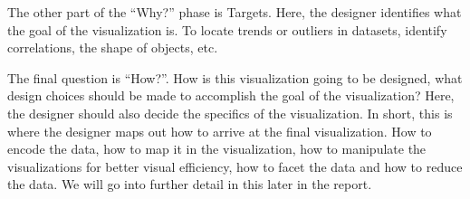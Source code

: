 \documentclass[Report.tex]{subfiles}
\begin{document}
The other part of the “Why?” phase is Targets. Here, the designer identifies what the goal of the visualization is. To locate trends or outliers in datasets, identify correlations, the shape of objects, etc. 

The final question is “How?”. How is this visualization going to be designed, what design choices should be made to accomplish the goal of the visualization? Here, the designer should also decide the specifics of the visualization. In short, this is where the designer maps out how to arrive at the final visualization. How to encode the data, how to map it in the visualization, how to manipulate the visualizations for better visual efficiency, how to facet the data and how to reduce the data. We will go into further detail in this later in the report.
\end{document}
